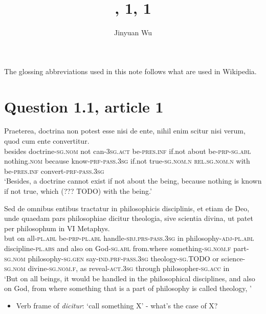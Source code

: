 \documentclass[a4paper, 12pt]{article}
\title{\form{Summa}, 1, 1}
\author{Jinyuan Wu}
\newcommand{\form}[1]{\emph{#1}}
\newcommand*{\category}[1]{\textsc{#1}}
\newcommand{\translate}[1]{`#1'}
\begin{document}
\maketitle

The glossing abbreviations used in this note 
follows what are used in Wikipedia.

\section{Question 1.1, article 1}

\begin{exe}
    \ex \gll Praeterea, doctrina non potest esse nisi de ente, 
    nihil enim scitur nisi verum, 
    quod cum ente convertitur. \\
    besides doctrine-\category{sg.nom} not can-\category{3sg.act} be-\category{pres.inf}
    if.not about be-\category{prp}-\category{sg.abl}
    nothing.\category{nom} because know-\category{prf}-\category{pass.3sg}
    if.not true-\category{sg.nom.n} 
    \category{rel}.\category{sg.nom.n} with be-\category{pres.inf} convert-\category{prf}-\category{pass.3sg} \\
    \translate{Besides, a doctrine cannot exist if not about the being, 
    because nothing is known if not true, 
    which (??? TODO) with the being.}
    
    \ex \gll Sed de omnibus entibus 
    tractatur in philosophicis disciplinis, 
    et etiam de Deo, 
    unde quaedam pars philosophiae dicitur theologia, 
    sive scientia divina, 
    ut patet per philosophum in VI Metaphys. \\
    but on all-\category{pl.abl} be-\category{prp}-\category{pl.abl}  
    handle-\category{sbj.prs}-\category{pass.3sg} in philosophy-\category{adj}-\category{pl.abl} discipline-\category{pl.abs} 
    and also on God-\category{sg.abl}
    from.where something-\category{sg.nom.f} part-\category{sg.nom} philosophy-\category{sg.gen} say-\category{ind.prf}-\category{pass.3sg} theology-\category{sg.TODO} 
    or science-\category{sg.nom} divine-\category{sg.nom.f},
    as reveal-\category{act.3sg} through philosopher-\category{sg.acc} in  \\
    \glt \translate{But on all beings, it would be handled in the philosophical disciplines, 
    and also on God, 
    from where something that is a part of philosophy is called theology,
    }
\end{exe}

\begin{itemize}
    \item Verb frame of \form{dicitur}: \translate{call something X} - what's the case of X?
\end{itemize}
\end{document}
